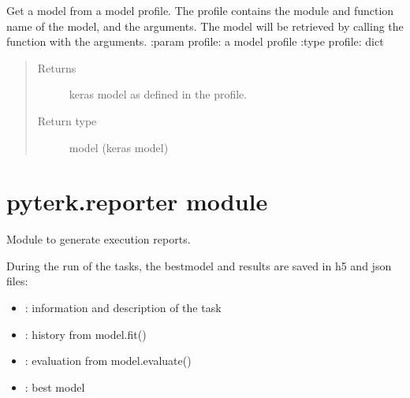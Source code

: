 \documentclass[letterpaper,10pt,english]{sphinxmanual}
\begin{document}
\begin{fulllineitems}
\label{\detokenize{pyterk:pyterk.models.get_model}}
\sphinxAtStartPar
Get a model from a model profile.
The profile contains the module and function name of the model, and the arguments.
The model will be retrieved by calling the function with the arguments.
:param profile: a model profile
:type profile: dict
\begin{quote}\begin{description}
\item[{Returns}] \leavevmode
\sphinxAtStartPar
keras model as defined in the profile.

\item[{Return type}] \leavevmode
\sphinxAtStartPar
model (keras model)

\end{description}\end{quote}

\end{fulllineitems}



\section{pyterk.reporter module}
\label{\detokenize{pyterk:module-pyterk.reporter}}\label{\detokenize{pyterk:pyterk-reporter-module}}
\sphinxAtStartPar
Module to generate execution reports.

\sphinxAtStartPar
During the run of the tasks, the bestmodel and results are saved in h5 and json files:
\begin{itemize}
\item {} 
\sphinxAtStartPar
{} : information and description of the task

\item {} 
\sphinxAtStartPar
{} : history from model.fit()

\item {} 
\sphinxAtStartPar
{} : evaluation from model.evaluate()

\item {} 
\sphinxAtStartPar
{} : best model

\end{itemize}
\end{document}
